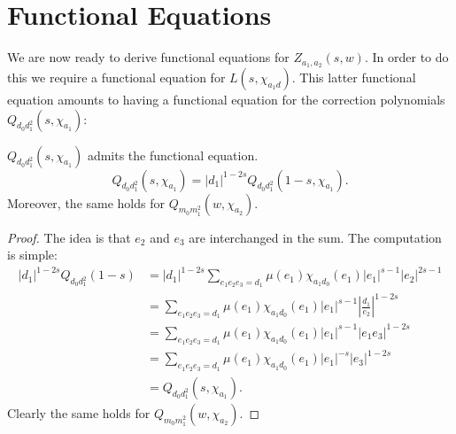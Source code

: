 \documentclass[12pt,reqno,oneside]{amsart}
\begin{document}
\section{Functional Equations}
    We are now ready to derive functional equations for $Z_{a_{1},a_{2}}(s,w)$. In order to do this we require a functional equation for $L(s,\chi_{a_{1}d})$. This latter functional equation amounts to having a functional equation for the correction polynomials $Q_{d_{0}d_{1}^{2}}(s,\chi_{a_{1}})$:

    \begin{theorem}\label{thm:functional_equation_correction_polynomials}
        $Q_{d_{0}d_{1}^{2}}(s,\chi_{a_{1}})$ admits the functional equation.
        \[
            Q_{d_{0}d_{1}^{2}}(s,\chi_{a_{1}}) = |d_{1}|^{1-2s}Q_{d_{0}d_{1}^{2}}(1-s,\chi_{a_{1}}).
        \]
        Moreover, the same holds for $Q_{m_{0}m_{1}^{2}}(w,\chi_{a_{2}})$.
    \end{theorem}
    \begin{proof}
        The idea is that $e_{2}$ and $e_{3}$ are interchanged in the sum. The computation is simple:
        \begin{align*}
            |d_{1}|^{1-2s}Q_{d_{0}d_{1}^{2}}(1-s) &= |d_{1}|^{1-2s}\sum_{e_{1}e_{2}e_{3} = d_{1}}\mu(e_{1})\chi_{a_{1}d_{0}}(e_{1})|e_{1}|^{s-1}|e_{2}|^{2s-1} \\
            &= \sum_{e_{1}e_{2}e_{3} = d_{1}}\mu(e_{1})\chi_{a_{1}d_{0}}(e_{1})|e_{1}|^{s-1}\left|\frac{d_{1}}{e_{2}}\right|^{1-2s} \\
            &= \sum_{e_{1}e_{2}e_{3} = d_{1}}\mu(e_{1})\chi_{a_{1}d_{0}}(e_{1})|e_{1}|^{s-1}|e_{1}e_{3}|^{1-2s} \\
            &= \sum_{e_{1}e_{2}e_{3} = d_{1}}\mu(e_{1})\chi_{a_{1}d_{0}}(e_{1})|e_{1}|^{-s}|e_{3}|^{1-2s} \\
            &= Q_{d_{0}d_{1}^{2}}(s,\chi_{a_{1}}).
        \end{align*}
        Clearly the same holds for $Q_{m_{0}m_{1}^{2}}(w,\chi_{a_{2}})$.
    \end{proof}
\end{document}
